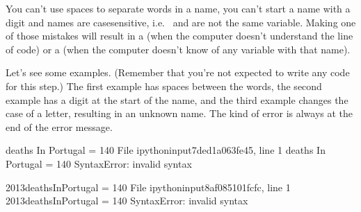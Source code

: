 \documentclass[letterpaper,10pt,english]{sphinxmanual}
\begin{document}
You can’t use spaces to separate words in a name, you can’t start a name with a digit and names are case\sphinxhyphen{}sensitive, i.e.  and  are not the same variable. Making one of those mistakes will result in a  (when the computer doesn’t understand the line of code) or a  (when the computer doesn’t know of any variable with that name).

Let’s see some examples. (Remember that you’re not expected to write any code for this step.) The first example has spaces between the words, the second example has a digit at the start of the name, and the third example changes the case of a letter, resulting in an unknown name. The kind of error is always at the end of the error message.


{
\begin{sphinxVerbatim}[commandchars=\\\{\}]
\llap{\color{nbsphinxin}[ ]:\,\hspace{\fboxrule}\hspace{\fboxsep}}
deaths In Portugal = 140
File \PYGZdq{}\PYGZlt{}ipython\PYGZhy{}input\PYGZhy{}7\PYGZhy{}ded1a063fe45\PYGZgt{}\PYGZdq{}, line 1
deaths In Portugal = 140
\PYGZca{}
SyntaxError: invalid syntax
\end{sphinxVerbatim}
}


{
\begin{sphinxVerbatim}[commandchars=\\\{\}]
\llap{\color{nbsphinxin}[ ]:\,\hspace{\fboxrule}\hspace{\fboxsep}}
2013deathsInPortugal = 140
File \PYGZdq{}\PYGZlt{}ipython\PYGZhy{}input\PYGZhy{}8\PYGZhy{}af085101fcfc\PYGZgt{}\PYGZdq{}, line 1
2013deathsInPortugal = 140
\PYGZca{}
SyntaxError: invalid syntax
\end{sphinxVerbatim}
}

\end{document}
